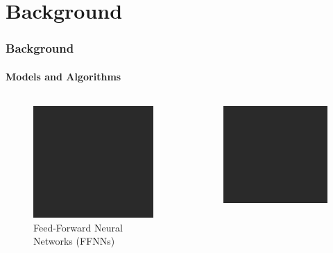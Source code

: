 \documentclass[xcolor={svgnames,table},10pt,fleqn]{beamer}
\begin{document}
\section{Background}
\begin{frame}
    \frametitle{Background}
    \framesubtitle{Models and Algorithms}
    \begin{columns}
        \begin{column}{.5\textwidth}
            \begin{figure}
            \includegraphics[height=0.2\textheight, width=\linewidth, keepaspectratio]{todo}
                \caption{Feed-Forward Neural Networks (FFNNs)}
            \end{figure}
        \end{column}
        \begin{column}{.5\textwidth}
            \begin{figure}
            \includegraphics[height=0.2\textheight, width=\linewidth, keepaspectratio]{todo}

\end{figure}
\end{column}
\end{columns}
\end{frame}
\end{document}
